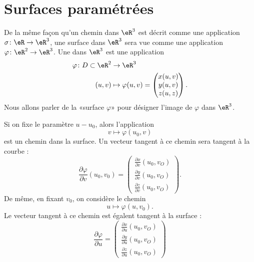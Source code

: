 
\section{Surfaces paramétrées}

De la même façon qu'un chemin dans \( \eR^3\) est décrit comme une application \( \sigma\colon \eR\to \eR^3\), une surface dans \( \eR^3\) sera vue comme une application \( \varphi\colon \eR^2\to \eR^3\). Une  dans \( \eR^3\) est une application
\begin{equation}
	\begin{aligned}
		\varphi\colon D\subset\eR^2 & \to \eR^3                                       \\
		(u,v)                       & \mapsto \varphi(u,v)=\begin{pmatrix}
			x(u,v) \\
			y(u,v) \\
			z(u,z)
		\end{pmatrix}.
	\end{aligned}
\end{equation}
Nous allons parler de la «surface \( \varphi\)» pour désigner l'image de \( \varphi\) dans \( \eR^3\).

Si on fixe le paramètre \( u-u_0\), alors l'application
\begin{equation}
	v\mapsto\varphi(u_0,v)
\end{equation}
est un chemin dans la surface. Un vecteur tangent à ce chemin sera tangent à la courbe :
\begin{equation}
	\frac{ \partial \varphi }{ \partial v }(u_0,v_0)=
	\begin{pmatrix}
		\frac{ \partial x }{ \partial v }(u_0,v_O) \\
		\frac{ \partial y }{ \partial v }(u_0,v_O) \\
		\frac{ \partial z }{ \partial v }(u_0,v_O)
	\end{pmatrix}.
\end{equation}
De même, en fixant \( v_0\), on considère le chemin
\begin{equation}
	u\mapsto\varphi(u,v_0).
\end{equation}
Le vecteur tangent à ce chemin est égalent tangent à la surface :
\begin{equation}
	\frac{ \partial \varphi }{ \partial u }=
	\begin{pmatrix}
		\frac{ \partial x }{ \partial u }(u_0,v_O) \\
		\frac{ \partial y }{ \partial u }(u_0,v_O) \\
		\frac{ \partial z }{ \partial u }(u_0,v_O)
	\end{pmatrix}
\end{equation}

